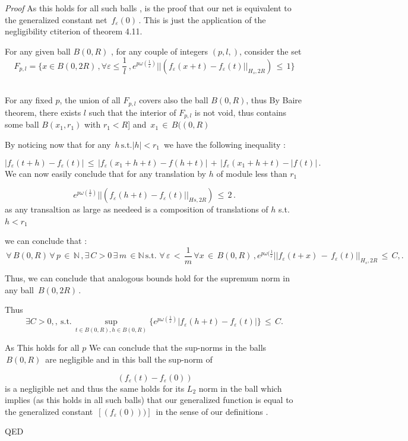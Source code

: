 \documentclass[10pt,a4paper]{amsart}
\newcommand{\NN}{\mathbb N}
\newenvironment{proof}{\emph{Proof} }{QED}
\begin{document}
\begin{proof}
    As this holds for all such balls ,  is the proof that our net is equivalent to the  generalized constant net
     $  \,f_\varepsilon(0)\,.$ 
  This is just the application of the negligibility ctiterion of theorem 4.11.
 
 For any given ball $B(0,R)$ , for any couple  of integers 
 $(p,l,)$, consider the set 
$$F_{p,l}= \{x\in B(0,2R)\,,\forall \varepsilon \leq \frac{1}{l}\,,
e^{p\omega(\frac{1}{\varepsilon})} ||(f_\varepsilon(x+t)-f_\varepsilon (t) ||_{H_s,2R})\,
\leq\,1\}$$\



For any fixed $p$, the union of all $F_{p,l}$  covers also the ball $B(0,R)$,  thus By Baire theorem, there exists $l$ such that the interior of $F_{p,l}$ is not void, thus contains some ball $B(x_1,r_1)$ with $r_1< R $] and
 $\,x_1\,\in \,B((0,R)\,$

By noticing now that for any
 $\,h\,\mbox{s.t.}|h|<r_1\,$ we have the following inequality :

$$|f_\varepsilon (t+h)-f_\varepsilon(t)|\,\leq\,
|f_\varepsilon(x_1+h+t)-f(h+t)|
\,+\,|f_\varepsilon (x_1+h+t)-|f(t)|\,.$$ We can now easily conclude that for any translation by $h$ of module less than
 $r_1$

$$e^{p\omega(\frac{1}{\varepsilon})}||(f_\varepsilon(h+t)-f_\varepsilon (t) ||_{Hs,2R})\,\leq\,2 \,.$$ as any transaltion as large as needeed is a composition of translations of $h$ s.t. $h<r_1$ 

we can conclude  that :
$$\,\forall \,B(0,R)\,\forall\,p\,\in \,\NN\,,\exists\, C>0 \,\exists \,m\,\in \NN \,\mbox{s.t.}\,
\,\forall \,\varepsilon \,<\,\frac{1}{m}\,\forall x\,\in\,B(0,R)\,,
e^{p\omega(\frac{1}{\varepsilon}}||f_\varepsilon(t+x)\,-\,
f_\varepsilon(t) ||_{H_s,2R}\,\leq\,C,.$$

  Thus, we can conclude that analogous bounds hold for the supremum norm  in any ball $\,B(0,2R)\,.$

Thus 
\begin{equation*}
\exists C>0,,\ \mbox{s.t.}\,\sup_{t\in B(0,R),h\in B(0,R)}
\{e^{p\omega(\frac{1}{\varepsilon})}
|f_\varepsilon(h+t)-f_\varepsilon (t) |\}
\,\leq\,C.
\end{equation*}


As This holds for all $p$
We can  conclude that the sup-norms in the balls
$\,B(0,R)\,$  are negligible and in this ball the sup-norm of

 $$\,(f_\varepsilon(t) - f_\varepsilon(0)) $$
 is a negligible net and thus the same holds for its  $L_2$ norm 
 in the ball which implies (as this holds in all such balls) that our generalized function is equal to the generalized constant 
 $\,[(f_\varepsilon(0)))]\,$ in the sense of our definitions .
  

\end{proof}
\end{document}
